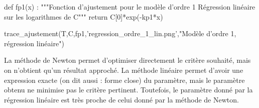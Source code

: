 \question{}
\begin{pyverbatim}
def fp1(x) :
    """Fonction d'ajustement pour le modèle d'ordre 1
    Régression linéaire sur les logarithmes de C"""
    return  C[0]*exp(-kp1*x)


trace_ajustement(T,C,fp1,'regression_ordre_1_lin.png',"Modèle d'ordre 1, régression linéaire")
\end{pyverbatim}

\question{}
La méthode de Newton permet d'optimiser directement le critère souhaité, mais on n'obtient qu'un résultat approché. 
La méthode linéaire permet d'avoir une expression exacte (on dit aussi : forme close) du paramètre, mais le paramètre obtenu ne minimise pas le critère pertinent. 
Toutefois, le paramètre donné par la régression linéaire est très proche de celui donné par la méthode de Newton. 

